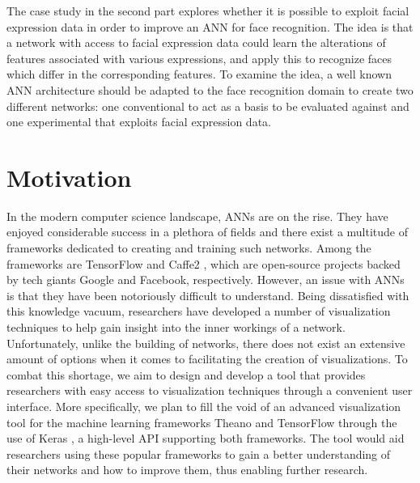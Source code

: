 \noindent The case study in the second part explores whether it is possible to exploit facial expression data in order to improve an ANN for face recognition. The idea is that a network with access to facial expression data could learn the alterations of features associated with various expressions, and apply this to recognize faces which differ in the corresponding features. To examine the idea, a well known ANN architecture should be adapted to the face recognition domain to create two different networks: one conventional to act as a basis to be evaluated against and one experimental that exploits facial expression data.\\

\section{Motivation}

\noindent In the modern computer science landscape, ANNs are on the rise. They have enjoyed considerable success in a plethora of fields and there exist a multitude of frameworks dedicated to creating and training such networks. Among the frameworks are TensorFlow \cite{tensorflow2015-whitepaper} and Caffe2 \cite{caffe2}, which are open-source projects backed by tech giants Google and Facebook, respectively. However, an issue with ANNs is that they have been notoriously difficult to understand. Being dissatisfied with this knowledge vacuum, researchers have developed a number of visualization techniques to help gain insight into the inner workings of a network. Unfortunately, unlike the building of networks, there does not exist an extensive amount of options when it comes to facilitating the creation of visualizations. To combat this shortage, we aim to design and develop a tool that provides researchers with easy access to visualization techniques through a convenient user interface. More specifically, we plan to fill the void of an advanced visualization tool for the machine learning frameworks Theano \cite{2016arXiv160502688short} and TensorFlow through the use of Keras \cite{chollet2015keras}, a high-level API supporting both frameworks. The tool would aid researchers using these popular frameworks to gain a better understanding of their networks and how to improve them, thus enabling further research. \\

